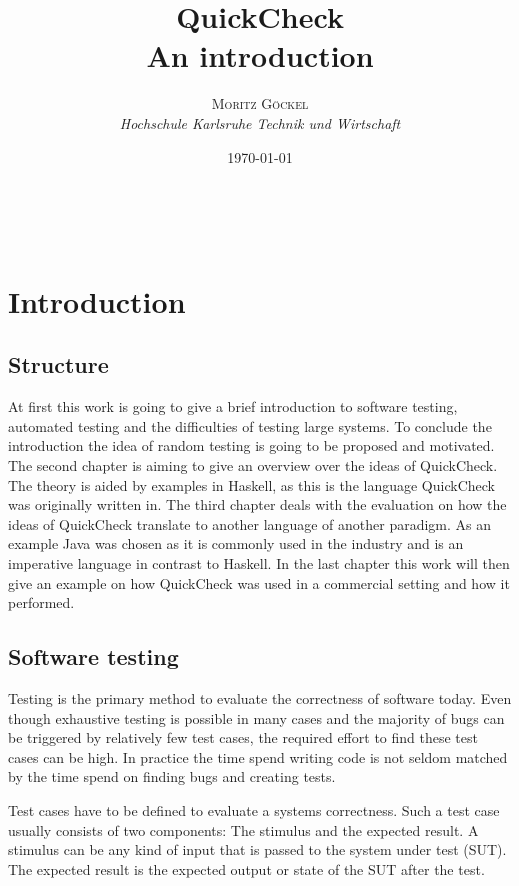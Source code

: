 \documentclass[a4paper, 12pt]{article} %
\title{\textbf{QuickCheck}\\ %
An introduction} %
\author{\textsc{Moritz G\"ockel} %
\\{\textit{Hochschule Karlsruhe Technik und Wirtschaft}}} %
\date{\today}
\makeatletter
\renewcommand{\maketitle}{ 
\begin{flushright} %
{\LARGE\@title} %

\vspace{50pt} %

{\large\@author}
\\\@date 

\vspace{40pt}
\end{flushright}
}
\makeatother
\begin{document}
\maketitle

\vspace{30pt}

\newpage
\tableofcontents

\newpage
\section{Introduction}

\subsection{Structure}

At first this work is going to give a brief introduction to software testing, automated testing and the difficulties of testing large systems. To conclude the introduction the idea of random testing is going to be proposed and motivated. The second chapter is aiming to give an overview over the ideas of QuickCheck. The theory is aided by examples in Haskell, as this is the language QuickCheck was originally written in. The third chapter deals with the evaluation on how the ideas of QuickCheck translate to another language of another paradigm. As an example Java was chosen as it is commonly used in the industry and is an imperative language in contrast to Haskell. In the last chapter this work will then give an example on how QuickCheck was used in a commercial setting and how it performed.

\subsection{Software testing}

Testing is the primary method to evaluate the correctness of software today. \cite{Ammann2016} Even though exhaustive testing is possible in many cases and the majority of bugs can be triggered by relatively few test cases, \cite{Kuhn2004} the required effort to find these test cases can be high. In practice the time spend writing code is not seldom matched by the time spend on finding bugs and creating tests.

Test cases have to be defined to evaluate a systems correctness. Such a test case usually consists of two components: The stimulus and the expected result. A stimulus can be any kind of input that is passed to the system under test (SUT). The expected result is the expected output or state of the SUT after the test.
\end{document}

